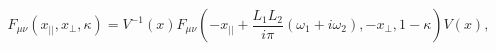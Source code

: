 \begin{equation} \label{duality}
F_{\mu\nu}(x_{||},x_\perp,\kappa)=
V^{-1}(x)
F_{\mu\nu}\left(-x_{||}+\frac{L_1 L_2}{i\pi}(\omega_1+i\omega_2),-x_\perp,
1-\kappa\right)V(x),
\end{equation}

